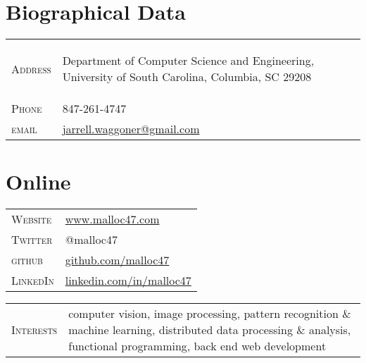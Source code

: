 \documentclass[10pt]{article}
\begin{document}
\pagestyle{empty}

\par{\bigskip\par}

\begin{multicols}{2}
\setlength{\parskip}{0pt}
\section{Biographical Data}

\begin{tabular}{l p{5.2cm}}
  \textsc{Address}	& \begin{footnotesize} Department of Computer Science and Engineering, University of South Carolina, Columbia, SC 29208 \end{footnotesize} \\
  \textsc{Phone}       & 847-261-4747\\
  \textsc{email}       & \href{mailto:jarrell.waggoner@gmail.com}{jarrell.waggoner@gmail.com} \\
\end{tabular}

\vfill
\columnbreak

\section{Online}
\begin{tabular}{l p{5cm}}
  \textsc{Website}	& \href{http://www.malloc47.com}{www.malloc47.com} \\
  \textsc{Twitter}     & @malloc47 \\
  \textsc{github}      & \href{http://www.github.com/malloc47}{github.com/malloc47}\\
  \textsc{LinkedIn}    & \href{http://www.linkedin.com/in/malloc47}{linkedin.com/in/malloc47} \\
\end{tabular}

\end{multicols}

\begin{tabularx}{\textwidth}{l X}
  \textsc{Interests} & computer vision, image processing, pattern
  recognition \& machine learning, distributed data processing \&
  analysis, functional programming, back end web development
\end{tabularx}
\end{document}
